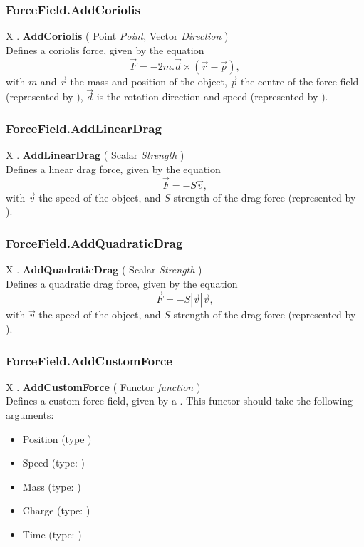 \subsubsection{ForceField.AddCoriolis \label{F:ForceField:AddCoriolis}}
X . \textbf{AddCoriolis} ( Point \textit{Point}, Vector \textit{Direction} ) \\
Defines a coriolis force, given by the equation
\begin{equation}
\vec{F}= - 2 m .  \vec{d} \times (\vec{r}-\vec{p})
,
\end{equation}
with $m$ and $\vec{r}$ the mass and position of the object, $\vec{p}$ the centre of the force field (represented by ), $\vec{d}$ is the rotation direction and speed (represented by ).



\subsubsection{ForceField.AddLinearDrag \label{F:ForceField:AddLinearDrag}}
X . \textbf{AddLinearDrag} ( Scalar \textit{Strength} ) \\
Defines a linear drag force, given by the equation
\begin{equation}
\vec{F}= - S \vec{v}
,
\end{equation}
with $\vec{v}$ the speed of the object, and $S$ strength of the drag force (represented by ).



\subsubsection{ForceField.AddQuadraticDrag \label{F:ForceField:AddQuadraticDrag}}
X . \textbf{AddQuadraticDrag} ( Scalar \textit{Strength} ) \\
Defines a quadratic drag force, given by the equation
\begin{equation}
\vec{F}= - S |\vec{v}| \vec{v}
,
\end{equation}
with $\vec{v}$ the speed of the object, and $S$ strength of the drag force (represented by ).



\subsubsection{ForceField.AddCustomForce \label{F:ForceField:AddCustomForce}}
X . \textbf{AddCustomForce} ( Functor \textit{function} ) \\
Defines a custom force field, given by a . This functor should take the following arguments:
\begin{itemize}
\item
Position (type )
\item
Speed (type: )
\item
Mass (type: )
\item
Charge (type: )
\item
Time (type: )
\end{itemize}


